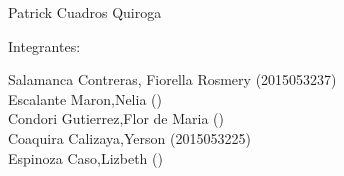 \documentclass[12pt]{article}
\begin{document}
\begin{titlepage}
\begin{center}
\vspace*{0.1in}
\begin{large}
 Patrick Cuadros Quiroga\\
\end{large}

\vspace*{0.2in}
\vspace*{0.1in}
\begin{large}
Integrantes: \\
\begin{flushleft}
Salamanca Contreras, Fiorella Rosmery		\hfill	(2015053237) \\
Escalante Maron,Nelia 		\hfill	() \\
Condori Gutierrez,Flor de Maria            	\hfill	() \\
Coaquira Calizaya,Yerson     	\hfill	(2015053225) \\
Espinoza Caso,Lizbeth   		\hfill	() \\

\end{flushleft}
\end{large}
\end{center}

\end{titlepage}
\end{document}
